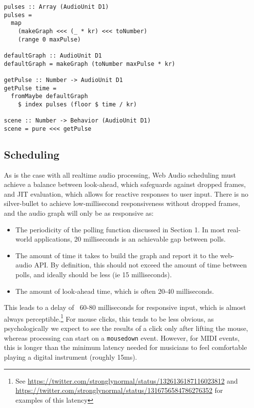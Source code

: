 \documentclass{sig-alternate}
\begin{document}
\begin{sloppypar}
\begin{verbatim}
pulses :: Array (AudioUnit D1)
pulses =
  map
    (makeGraph <<< (_ * kr) <<< toNumber)
    (range 0 maxPulse)

defaultGraph :: AudioUnit D1
defaultGraph = makeGraph (toNumber maxPulse * kr)

getPulse :: Number -> AudioUnit D1
getPulse time =
  fromMaybe defaultGraph
    $ index pulses (floor $ time / kr)

scene :: Number -> Behavior (AudioUnit D1)
scene = pure <<< getPulse
  \end{verbatim}

  \subsection{Scheduling}

  As is the case with all realtime audio processing, Web Audio scheduling must achieve a balance between look-ahead, which safeguards against dropped frames, and JIT evaluation, which allows for reactive responses to user input.\cite{schnell2015time}\cite{pendharkar2015adventures} There is no silver-bullet to achieve low-millisecond responsiveness without dropped frames, and the audio graph will only be as responsive as:

  \begin{itemize}
    \item The periodicity of the polling function discussed in Section 1. In most real-world applications, 20 milliseconds is an achievable gap between polls.
    \item The amount of time it takes to build the graph and report it to the web-audio API.  By definition, this should not exceed the amount of time between polls, and ideally should be less (ie 15 milliseconds).
    \item The amount of look-ahead time, which is often 20-40 milliseconds.
  \end{itemize}

  This leads to a delay of ~60-80 milliseconds for responsive input, which is almost always perceptible.\footnote{See \url{https://twitter.com/stronglynormal/status/1326136187116023812} and \url{https://twitter.com/stronglynormal/status/1316756584786276352} for examples of this latency} For mouse clicks, this tends to be less obvious, as psychologically we expect to see the results of a click only after lifting the mouse, whereas processing can start on a \texttt{mousedown} event. However, for MIDI events, this is longer than the minimum latency needed for musicians to feel comfortable playing a digital instrument (roughly 15ms).\cite{jack2018action}


\end{sloppypar}
\end{document}
